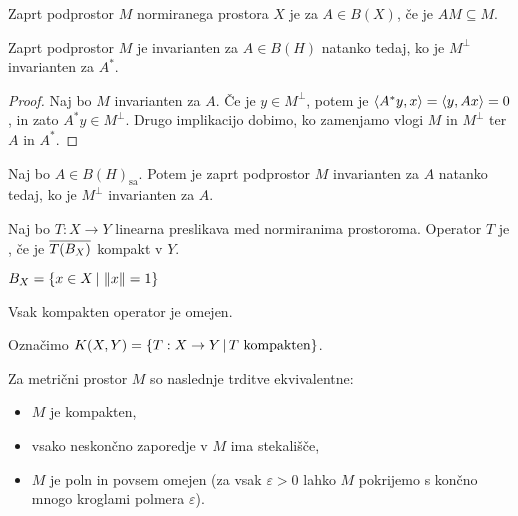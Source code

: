 
\begin{definicija}
  Zaprt podprostor $M$ normiranega prostora $X$ je  za $A \in
  B(X)$, če je $AM \subseteq M$.
\end{definicija}

\begin{trditev}
  Zaprt podprostor $M$ je invarianten za $A \in B(H)$ natanko tedaj, ko je
  $M^\bot$ invarianten za $A^*$.
\end{trditev}

\begin{proof}
  Naj bo $M$ invarianten za $A$.
  Če je $y \in M^\bot$, potem je $\left< A^* y, x \right> = \left< y, Ax \right> = 0$, in zato $A^*
  y \in M^\bot$.
  Drugo implikacijo dobimo, ko zamenjamo vlogi $M$ in $M^\bot$ ter $A$ in $A^*$.
\end{proof}

\begin{posledica}
  Naj bo $A \in B(H)_{\text{sa}}$.
  Potem je zaprt podprostor $M$ invarianten za $A$ natanko tedaj, ko je $M^\bot$
  invarianten za $A$.
\end{posledica}


\begin{definicija}
  Naj bo $T: X \to Y$ linearna preslikava med normiranima prostoroma.
  Operator $T$ je , če je $\overline{T(B_X)}$ kompakt v $Y$.
\end{definicija}

\begin{opomba}
  $B_X = \{ x \in X \,|\, \left\lVert x\right\rVert = 1 \}$
\end{opomba}

\begin{opomba}
  Vsak kompakten operator je omejen.
\end{opomba}

Označimo $K(X,Y) = \{ T: X \to Y \,|\, \text{$T$ kompakten} \}$.

\begin{izrek}
  Za metrični prostor $M$ so naslednje trditve ekvivalentne:
  \begin{itemize}
  \item $M$ je kompakten,
  \item vsako neskončno zaporedje v $M$ ima stekališče,
  \item $M$ je poln in povsem omejen (za vsak $\varepsilon > 0$ lahko $M$
	pokrijemo s končno mnogo kroglami polmera $\varepsilon$).
  \end{itemize}
\end{izrek}

